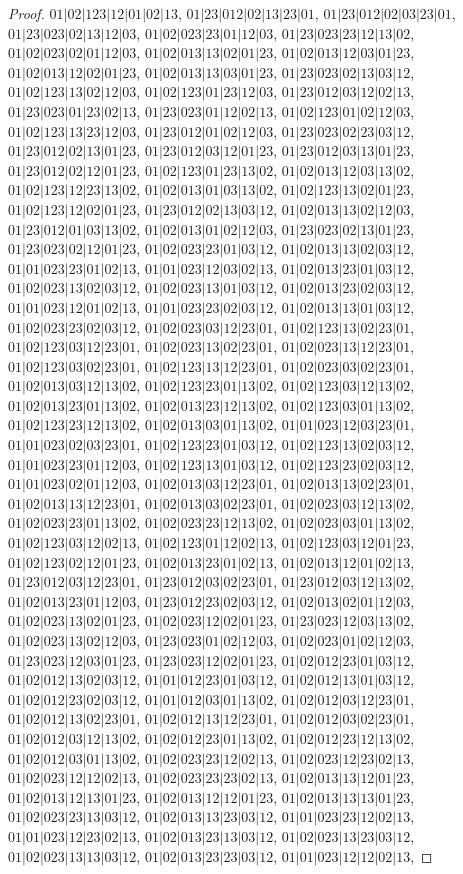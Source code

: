 \documentclass[12pt]{article}
\theoremstyle{plain}
\theoremstyle{definition}
\theoremstyle{remark}
\begin{document}
\begin{proof}
$01|02|123|12|01|02|13$, $01|23|012|02|13|23|01$, $01|23|012|02|03|23|01$, $01|23|023|02|13|12|03$, $01|02|023|23|01|12|03$, $01|23|023|23|12|13|02$, $01|02|023|02|01|12|03$, $01|02|013|13|02|01|23$, $01|02|013|12|03|01|23$, $01|02|013|12|02|01|23$, $01|02|013|13|03|01|23$, $01|23|023|02|13|03|12$, $01|02|123|13|02|12|03$, $01|02|123|01|23|12|03$, $01|23|012|03|12|02|13$, $01|23|023|01|23|02|13$, $01|23|023|01|12|02|13$, $01|02|123|01|02|12|03$, $01|02|123|13|23|12|03$, $01|23|012|01|02|12|03$, $01|23|023|02|23|03|12$, $01|23|012|02|13|01|23$, $01|23|012|03|12|01|23$, $01|23|012|03|13|01|23$, $01|23|012|02|12|01|23$, $01|02|123|01|23|13|02$, $01|02|013|12|03|13|02$, $01|02|123|12|23|13|02$, $01|02|013|01|03|13|02$, $01|02|123|13|02|01|23$, $01|02|123|12|02|01|23$, $01|23|012|02|13|03|12$, $01|02|013|13|02|12|03$, $01|23|012|01|03|13|02$, $01|02|013|01|02|12|03$, $01|23|023|02|13|01|23$, $01|23|023|02|12|01|23$, $01|02|023|23|01|03|12$, $01|02|013|13|02|03|12$, $01|01|023|23|01|02|13$, $01|01|023|12|03|02|13$, $01|02|013|23|01|03|12$, $01|02|023|13|02|03|12$, $01|02|023|13|01|03|12$, $01|02|013|23|02|03|12$, $01|01|023|12|01|02|13$, $01|01|023|23|02|03|12$, $01|02|013|13|01|03|12$, $01|02|023|23|02|03|12$, $01|02|023|03|12|23|01$, $01|02|123|13|02|23|01$, $01|02|123|03|12|23|01$, $01|02|023|13|02|23|01$, $01|02|023|13|12|23|01$, $01|02|123|03|02|23|01$, $01|02|123|13|12|23|01$, $01|02|023|03|02|23|01$, $01|02|013|03|12|13|02$, $01|02|123|23|01|13|02$, $01|02|123|03|12|13|02$, $01|02|013|23|01|13|02$, $01|02|013|23|12|13|02$, $01|02|123|03|01|13|02$, $01|02|123|23|12|13|02$, $01|02|013|03|01|13|02$, $01|01|023|12|03|23|01$, $01|01|023|02|03|23|01$, $01|02|123|23|01|03|12$, $01|02|123|13|02|03|12$, $01|01|023|23|01|12|03$, $01|02|123|13|01|03|12$, $01|02|123|23|02|03|12$, $01|01|023|02|01|12|03$, $01|02|013|03|12|23|01$, $01|02|013|13|02|23|01$, $01|02|013|13|12|23|01$, $01|02|013|03|02|23|01$, $01|02|023|03|12|13|02$, $01|02|023|23|01|13|02$, $01|02|023|23|12|13|02$, $01|02|023|03|01|13|02$, $01|02|123|03|12|02|13$, $01|02|123|01|12|02|13$, $01|02|123|03|12|01|23$, $01|02|123|02|12|01|23$, $01|02|013|23|01|02|13$, $01|02|013|12|01|02|13$, $01|23|012|03|12|23|01$, $01|23|012|03|02|23|01$, $01|23|012|03|12|13|02$, $01|02|013|23|01|12|03$, $01|23|012|23|02|03|12$, $01|02|013|02|01|12|03$, $01|02|023|13|02|01|23$, $01|02|023|12|02|01|23$, $01|23|023|12|03|13|02$, $01|02|023|13|02|12|03$, $01|23|023|01|02|12|03$, $01|02|023|01|02|12|03$, $01|23|023|12|03|01|23$, $01|23|023|12|02|01|23$, $01|02|012|23|01|03|12$, $01|02|012|13|02|03|12$, $01|01|012|23|01|03|12$, $01|02|012|13|01|03|12$, $01|02|012|23|02|03|12$, $01|01|012|03|01|13|02$, $01|02|012|03|12|23|01$, $01|02|012|13|02|23|01$, $01|02|012|13|12|23|01$, $01|02|012|03|02|23|01$, $01|02|012|03|12|13|02$, $01|02|012|23|01|13|02$, $01|02|012|23|12|13|02$, $01|02|012|03|01|13|02$, $01|02|023|23|12|02|13$, $01|02|023|12|23|02|13$, $01|02|023|12|12|02|13$, $01|02|023|23|23|02|13$, $01|02|013|13|12|01|23$, $01|02|013|12|13|01|23$, $01|02|013|12|12|01|23$, $01|02|013|13|13|01|23$, $01|02|023|23|13|03|12$, $01|02|013|13|23|03|12$, $01|01|023|23|12|02|13$, $01|01|023|12|23|02|13$, $01|02|013|23|13|03|12$, $01|02|023|13|23|03|12$, $01|02|023|13|13|03|12$, $01|02|013|23|23|03|12$, $01|01|023|12|12|02|13$, 
\end{proof}
\end{document}
